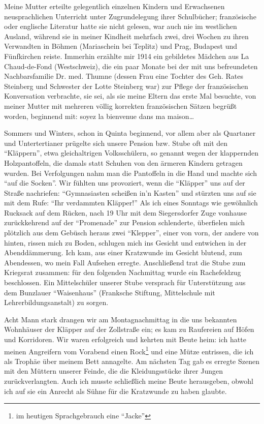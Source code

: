 \documentclass[a5paper,pagesize,10pt,twoside=true]{scrbook}
\begin{document}
Meine Mutter erteilte gelegentlich einzelnen Kindern und Erwachsenen neusprachlichen Unterricht unter Zugrundelegung ihrer Schulbücher; französische oder englische Literatur hatte sie nicht gelesen, war auch nie im westlichen Ausland, während sie in meiner Kindheit mehrfach zwei, drei Wochen zu ihren Verwandten in Böhmen (Mariaschein bei Teplitz) und Prag, Budapest und Fünfkirchen reiste. Immerhin erzählte mir 1914 ein gebildetes Mädchen aus La Chaud-de-Fond (Westschweiz), die ein paar Monate bei der mit uns befreundeten Nachbarsfamilie Dr. med. Thumne (dessen Frau eine Tochter des Geh. Rates Steinberg und Schwester der Lotte Steinberg war) zur Pflege der französischen Konversation verbrachte, sie sei, als sie meine Eltern das erste Mal besuchte, von meiner Mutter mit mehreren völlig korrekten französischen Sätzen begrüßt worden, beginnend mit: soyez la bienvenue dans ma maison\dots

Sommers und Winters, schon in Quinta beginnend, vor allem aber als Quartaner und Untertertianer prügelte sich unsere Pension bzw. Stube oft mit den \enquote{Kläppern}, etwa gleichaltrigen Volksschülern, so genannt wegen der klappernden Holzpantoffeln, die damals statt Schuhen von den ärmeren Kindern getragen wurden. Bei Verfolgungen nahm man die Pantoffeln in die Hand und machte sich \enquote{auf die Socken}. Wir fühlten uns provoziert, wenn die \enquote{Kläpper} uns auf der Straße nachriefen: \enquote{Gymnasiasten scheißen in'n Kasten} und stürzten uns auf sie mit dem Rufe: \enquote{Ihr verdammten Kläpper!} Als ich eines Sonntags wie gewöhnlich Rucksack auf dem Rücken, nach 19 Uhr mit dem Siegersdorfer Zuge vonhause zurückkehrend auf der \enquote{Promenade} zur Pension schlenderte, überfielen mich plötzlich aus dem Gebüsch heraus zwei \enquote{Klepper}, einer von vorn, der andere von hinten, rissen mich zu Boden, schlugen mich ins Gesicht und entwichen in der Abenddämmerung. Ich kam, aus einer Kratzwunde im Gesicht blutend, zum Abendessen, wo mein Fall Aufsehen erregte. Anschließend trat die Stube zum Kriegsrat zusammen: für den folgenden Nachmittag wurde ein Rachefeldzug beschlossen. Ein Mittelschüler unserer Stube versprach für Unterstützung aus dem Bunzlauer \enquote{Waisenhaus} (Franksche Stiftung, Mittelschule mit Lehrerbildungsanstalt) zu sorgen.

Acht Mann stark drangen wir am Montagnachmittag in die uns bekannten Wohnhäuser der Kläpper auf der Zollstraße ein; es kam zu Raufereien auf Höfen und Korridoren. Wir waren erfolgreich und kehrten mit Beute heim: ich hatte meinen Angreifern vom Vorabend einen Rock\footnote{im heutigen Sprachgebrauch eine \enquote{Jacke}} und eine Mütze entrissen, die ich als Trophäe über meinem Bett annagelte. Am nächsten Tag gab es erregte Szenen mit den Müttern unserer Feinde, die die Kleidungsstücke ihrer Jungen zurückverlangten. Auch ich musste schließlich meine Beute herausgeben, obwohl ich auf sie ein Anrecht als Sühne für die Kratzwunde zu haben glaubte.
\end{document}
